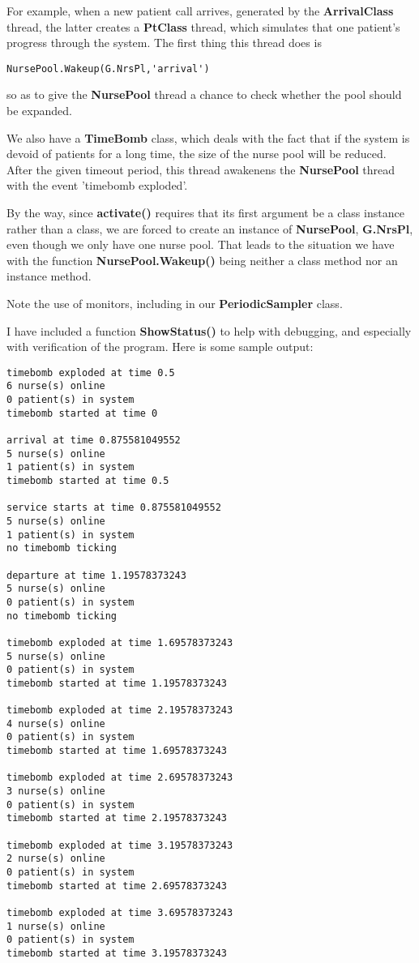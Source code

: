 \documentclass[11pt]{article}
\begin{document}
For example, when a new patient call arrives, generated by the {\bf
ArrivalClass} thread, the latter creates a {\bf PtClass} thread, which
simulates that one patient's progress through the system.  The first
thing this thread does is 

\begin{Verbatim}[fontsize=\relsize{-2}]
NursePool.Wakeup(G.NrsPl,'arrival')
\end{Verbatim}

so as to give the {\bf NursePool} thread a chance to check whether the
pool should be expanded.

We also have a {\bf TimeBomb} class, which deals with the fact that if
the system is devoid of patients for a long time, the size of the nurse
pool will be reduced.  After the given timeout period, this thread
awakenens the {\bf NursePool} thread with the event 'timebomb exploded'.

By the way, since {\bf activate()} requires that its first argument be a
class instance rather than a class, we are forced to create an instance
of {\bf NursePool}, {\bf G.NrsPl}, even though we only have one nurse
pool.  That leads to the situation we have with the function {\bf
NursePool.Wakeup()} being neither a class method nor an instance method.

Note the use of monitors, including in our {\bf PeriodicSampler} class.

I have included a function {\bf ShowStatus()} to help with debugging,
and especially with verification of the program.  Here is some sample
output:

\begin{Verbatim}[fontsize=\relsize{-2}]
timebomb exploded at time 0.5
6 nurse(s) online
0 patient(s) in system
timebomb started at time 0

arrival at time 0.875581049552
5 nurse(s) online
1 patient(s) in system
timebomb started at time 0.5

service starts at time 0.875581049552
5 nurse(s) online
1 patient(s) in system
no timebomb ticking

departure at time 1.19578373243
5 nurse(s) online
0 patient(s) in system
no timebomb ticking

timebomb exploded at time 1.69578373243
5 nurse(s) online
0 patient(s) in system
timebomb started at time 1.19578373243

timebomb exploded at time 2.19578373243
4 nurse(s) online
0 patient(s) in system
timebomb started at time 1.69578373243

timebomb exploded at time 2.69578373243
3 nurse(s) online
0 patient(s) in system
timebomb started at time 2.19578373243

timebomb exploded at time 3.19578373243
2 nurse(s) online
0 patient(s) in system
timebomb started at time 2.69578373243

timebomb exploded at time 3.69578373243
1 nurse(s) online
0 patient(s) in system
timebomb started at time 3.19578373243
\end{Verbatim}
\end{document}

